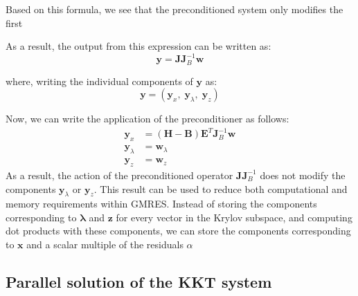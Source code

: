 \documentclass[12pt]{article}
\newcommand{\mb}{\mathbf}
\newcommand{\mbs}{\boldsymbol}
\begin{document}
Based on this formula, we see that the preconditioned system only
modifies the first

As a result, the output from this expression can be written as:
%
\begin{equation}
  \mb{y} = \mb{J}\mb{J}_{B}^{-1} \mb{w}
\end{equation}

where, writing the individual components of $\mb{y}$ as:
%
\begin{equation}
  \mb{y} = \left( \mb{y}_{x},\; \mb{y}_{\lambda},\; \mb{y}_{z} \right)
\end{equation}

Now, we can write the application of the preconditioner as follows:
%
\begin{equation}
  \begin{aligned}
    \mb{y}_{x} & = \left(\mb{H} - \mb{B}\right)\mb{E}^{T} \mb{J}_{B}^{-1} \mb{w} \\
    \mb{y}_{\lambda} & = \mb{w}_{\lambda} \\
    \mb{y}_{z} & = \mb{w}_{z} 
  \end{aligned}
\end{equation}
As a result, the action of the preconditioned operator $\mb{J}
\mb{J}_{B}^{-1}$ does not modify the components $\mb{y}_{\lambda}$ or
$\mb{y}_{z}$.  This result can be used to reduce both computational
and memory requirements within GMRES. Instead of storing the
components corresponding to $\mbs{\lambda}$ and $\mb{z}$ for every
vector in the Krylov subspace, and computing dot products with these
components, we can store the components corresponding to $\mb{x}$ and
a scalar multiple of the residuals $\alpha_{}$




\subsection{Parallel solution of the KKT system}






  
\end{document}
